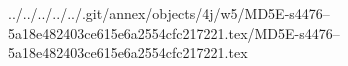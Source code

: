 ../../../../../.git/annex/objects/4j/w5/MD5E-s4476--5a18e482403ce615e6a2554cfc217221.tex/MD5E-s4476--5a18e482403ce615e6a2554cfc217221.tex